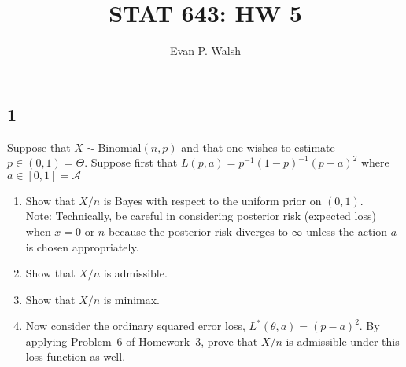 \documentclass[12pt]{article}
\title{STAT 643: HW 5}
\author{Evan P. Walsh}
\begin{document}
\maketitle


\subsection*{1}
\begin{tcolorbox}
  Suppose that $X \sim$Binomial$(n,p)$ and that one wishes to estimate $p\in(0,1)=\Theta$. Suppose first that $L(p,a)=p^{-1}(1-p)^{-1}(p-a)^2$ where $a\in[0,1]=\mathcal{A}$

  \begin{enumerate}[label=(\alph*)]
    \item Show that $X/n$ is Bayes with respect to the uniform prior on $(0,1)$.\\
      Note: Technically, be careful in considering posterior risk (expected loss) when $x=0$ or $n$ because the posterior risk diverges to $\infty$ unless the action $a$ is chosen appropriately.
    \item Show that $X/n$ is admissible.
    \item Show that $X/n$ is minimax.
    \item Now consider the ordinary squared error loss, $L^*(\theta,a)=(p-a)^2$.  By applying Problem~6 of Homework~3,
      prove that
      $X/n$ is admissible under this loss function as well.
  \end{enumerate}
\end{tcolorbox}
\end{document}
